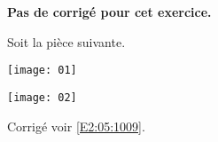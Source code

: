 \normaltrue \difficilefalse \tdifficilefalse
\correctionfalse


\setcounter{numques}{0}

\ifcorrection
\else
\textbf{Pas de corrigé pour cet exercice.}
\fi


\ifprof 
\else
Soit la pièce suivante.
\begin{center}
\texttt{[image: 01]}
\end{center}
 \fi
 
\ifprof
\else 
\begin{center}
\texttt{[image: 02]}
\end{center}
\fi

\ifprof
\else
\begin{flushright}
\footnotesize{Corrigé  voir \ref{E2:05:1009}.}
\end{flushright}%
\fi